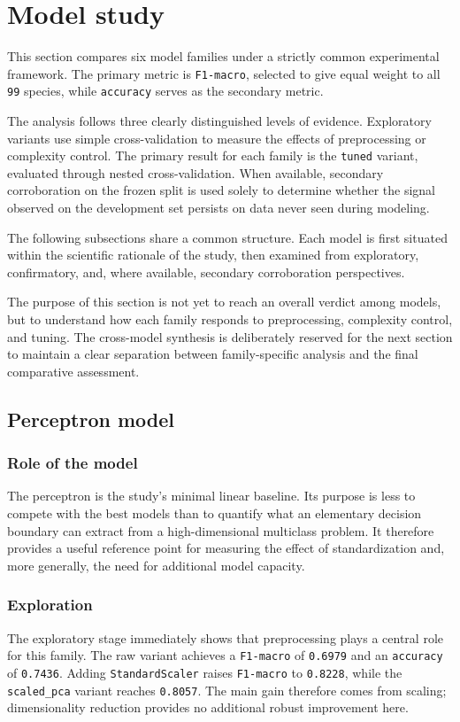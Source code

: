 \section{Model study}

This section compares six model families under a strictly common experimental framework. The primary metric is \texttt{F1-macro}, selected to give equal weight to all \texttt{99} species, while \texttt{accuracy} serves as the secondary metric.

The analysis follows three clearly distinguished levels of evidence. Exploratory variants use simple cross-validation to measure the effects of preprocessing or complexity control. The primary result for each family is the \texttt{tuned} variant, evaluated through nested cross-validation. When available, secondary corroboration on the frozen split is used solely to determine whether the signal observed on the development set persists on data never seen during modeling.

The following subsections share a common structure. Each model is first situated within the scientific rationale of the study, then examined from exploratory, confirmatory, and, where available, secondary corroboration perspectives.

The purpose of this section is not yet to reach an overall verdict among models, but to understand how each family responds to preprocessing, complexity control, and tuning. The cross-model synthesis is deliberately reserved for the next section to maintain a clear separation between family-specific analysis and the final comparative assessment.

\subsection{Perceptron model}

\subsubsection{Role of the model}
The perceptron is the study's minimal linear baseline. Its purpose is less to compete with the best models than to quantify what an elementary decision boundary can extract from a high-dimensional multiclass problem. It therefore provides a useful reference point for measuring the effect of standardization and, more generally, the need for additional model capacity.

\subsubsection{Exploration}
The exploratory stage immediately shows that preprocessing plays a central role for this family. The raw variant achieves a \texttt{F1-macro} of \texttt{0.6979} and an \texttt{accuracy} of \texttt{0.7436}. Adding \texttt{StandardScaler} raises \texttt{F1-macro} to \texttt{0.8228}, while the \texttt{scaled\_pca} variant reaches \texttt{0.8057}. The main gain therefore comes from scaling; dimensionality reduction provides no additional robust improvement here.

